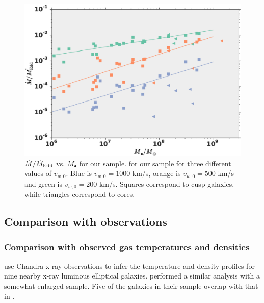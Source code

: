 \documentclass[usenatbib,fleqn]{mn2e}
\newcommand{\eddr}{\dot{M}/\dot{M}_{\rm Edd}}
\newcommand{\Mbh}[1][]{M_{\bullet#1}}
\newcommand{\vwO}{v_{w,0}}
\begin{document}
\begin{figure}
  \includegraphics[width=\columnwidth]{mdot_mass.eps}
  \caption{\label{fig:mdot_mass}$\eddr$ vs. $\Mbh$ for our sample. for
    our sample for three different values of $\vwO$. Blue is
    $\vwO=1000$ km/s, orange is $\vwO=500$ km/s and green is
    $\vwO=200$ km/s. Squares correspond to cusp galaxies, while
    triangles correspond to cores.}
\end{figure}


\subsection{Comparison with observations}
\subsubsection{Comparison with observed gas temperatures and densities}
\citealt{AllenDunn+:2006a} use Chandra x-ray observations to infer the
temperature and density profiles for nine nearby x-ray luminous
elliptical galaxies.  \citealt{RussellMcNamara+:2013a} performed a
similar analysis with a somewhat enlarged sample.
Five of the galaxies in their sample overlap with that in .
\end{document}
